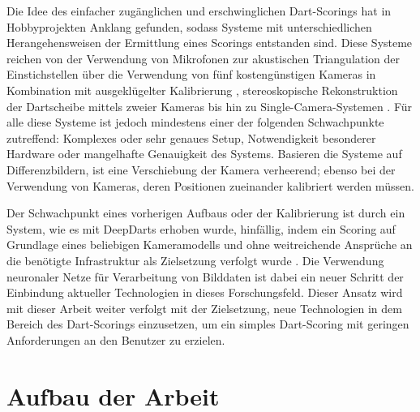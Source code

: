 Die Idee des einfacher zugänglichen und erschwinglichen Dart-Scorings hat in Hobbyprojekten Anklang gefunden, sodass Systeme mit unterschiedlichen Herangehensweisen der Ermittlung eines Scorings entstanden sind. Diese Systeme reichen von der Verwendung von Mikrofonen zur akustischen Triangulation der Einstichstellen \cite{dart_scoring_microphone} über die Verwendung von fünf kostengünstigen Kameras in Kombination mit ausgeklügelter Kalibrierung \cite{dart_scoring_multicam}, stereoskopische Rekonstruktion der Dartscheibe mittels zweier Kameras \cite{darts_project_3,darts_project_4} bis hin zu Single-Camera-Systemen \cite{darts_project_1,darts_project_2}. Für alle diese Systeme ist jedoch mindestens einer der folgenden Schwachpunkte zutreffend: Komplexes oder sehr genaues Setup, Notwendigkeit besonderer Hardware oder mangelhafte Genauigkeit des Systems. Basieren die Systeme auf Differenzbildern, ist eine Verschiebung der Kamera verheerend; ebenso bei der Verwendung von Kameras, deren Positionen zueinander kalibriert werden müssen.

Der Schwachpunkt eines vorherigen Aufbaus oder der Kalibrierung ist durch ein System, wie es mit DeepDarts erhoben wurde, hinfällig, indem ein Scoring auf Grundlage eines beliebigen Kameramodells und ohne weitreichende Ansprüche an die benötigte Infrastruktur als Zielsetzung verfolgt wurde \cite{deepdarts}. Die Verwendung neuronaler Netze für Verarbeitung von Bilddaten ist dabei ein neuer Schritt der Einbindung aktueller Technologien in dieses Forschungsfeld. Dieser Ansatz wird mit dieser Arbeit weiter verfolgt mit der Zielsetzung, neue Technologien in dem Bereich des Dart-Scorings einzusetzen, um ein simples Dart-Scoring mit geringen Anforderungen an den Benutzer zu erzielen.



\section{Aufbau der Arbeit}
\label{sec:aufbau}

